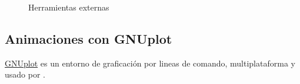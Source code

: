 \begin{figure}[H]
	\centering
	\caption{Herramientas externas}
	\label{}
\end{figure}


\subsection{Animaciones con GNUplot}
\href{http://www.gnuplot.info/}{GNUplot} es un entorno de graficación por lineas de comando, multiplataforma y usado por .

